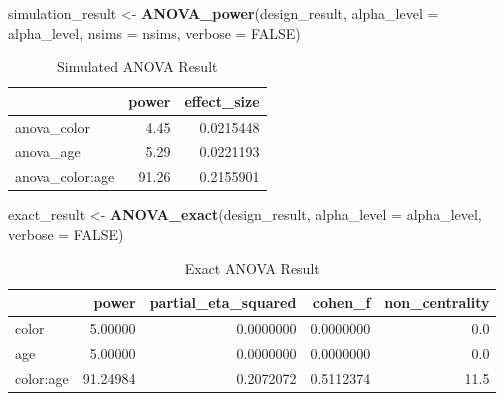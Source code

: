 \documentclass[
]{book}
\newenvironment{Shaded}{\begin{snugshade}}{\end{snugshade}}
\newcommand{\DataTypeTok}[1]{\textcolor[rgb]{0.13,0.29,0.53}{#1}}
\newcommand{\KeywordTok}[1]{\textcolor[rgb]{0.13,0.29,0.53}{\textbf{#1}}}
\newcommand{\NormalTok}[1]{#1}
\newcommand{\OtherTok}[1]{\textcolor[rgb]{0.56,0.35,0.01}{#1}}
\newcommand{\StringTok}[1]{\textcolor[rgb]{0.31,0.60,0.02}{#1}}
\begin{document}
\begin{Shaded}
\begin{Highlighting}[]
\NormalTok{simulation_result <-}\StringTok{ }\KeywordTok{ANOVA_power}\NormalTok{(design_result, }
                                 \DataTypeTok{alpha_level =}\NormalTok{ alpha_level, }
                                 \DataTypeTok{nsims =}\NormalTok{ nsims,}
                                 \DataTypeTok{verbose =} \OtherTok{FALSE}\NormalTok{)}
\end{Highlighting}
\end{Shaded}

\begin{table}[!h]

\caption{\label{tab:unnamed-chunk-147}Simulated ANOVA Result}
\centering
\begin{tabular}[t]{l|r|r}
\hline
  & power & effect\_size\\
\hline
anova\_color & 4.45 & 0.0215448\\
\hline
anova\_age & 5.29 & 0.0221193\\
\hline
anova\_color:age & 91.26 & 0.2155901\\
\hline
\end{tabular}
\end{table}

\begin{Shaded}
\begin{Highlighting}[]
\NormalTok{exact_result <-}\StringTok{ }\KeywordTok{ANOVA_exact}\NormalTok{(design_result,}
                            \DataTypeTok{alpha_level =}\NormalTok{ alpha_level,}
                            \DataTypeTok{verbose =} \OtherTok{FALSE}\NormalTok{)}
\end{Highlighting}
\end{Shaded}

\begin{table}[!h]

\caption{\label{tab:unnamed-chunk-149}Exact ANOVA Result}
\centering
\begin{tabular}[t]{l|r|r|r|r}
\hline
  & power & partial\_eta\_squared & cohen\_f & non\_centrality\\
\hline
color & 5.00000 & 0.0000000 & 0.0000000 & 0.0\\
\hline
age & 5.00000 & 0.0000000 & 0.0000000 & 0.0\\
\hline
color:age & 91.24984 & 0.2072072 & 0.5112374 & 11.5\\
\hline
\end{tabular}
\end{table}
\end{document}
